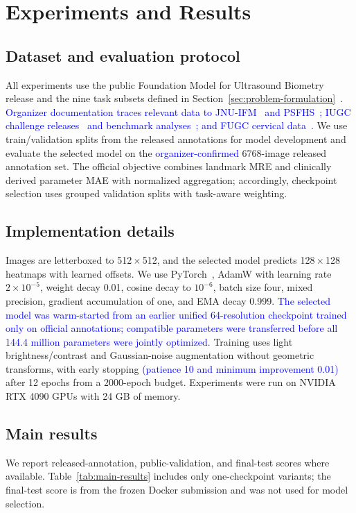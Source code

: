 \documentclass[runningheads]{llncs}
\newcommand{\revisiontext}[1]{\textcolor{blue}{#1}}
\begin{document}
\section{Experiments and Results}
\subsection{Dataset and evaluation protocol}
All experiments use the public Foundation Model for Ultrasound Biometry release and the nine task subsets defined in Section~\ref{sec:problem-formulation}~\cite{fubiometrychallenge}. \revisiontext{Organizer documentation traces relevant data to JNU-IFM~\cite{lu2022jnu} and PSFHS~\cite{chen2024psfhs,bai2025psfhs}; IUGC challenge releases~\cite{bai2024iugc,bai2025iugc} and benchmark analyses~\cite{bai2026iugc,bai2026iugcBeyond}; and FUGC cervical data~\cite{bai2024fugcDataset,bai2026fugc}.} We use train/validation splits from the released annotations for model development and evaluate the selected model on the \revisiontext{organizer-confirmed} 6768-image released annotation set. The official objective combines landmark MRE and clinically derived parameter MAE with normalized aggregation; accordingly, checkpoint selection uses grouped validation splits with task-aware weighting.

\subsection{Implementation details}
Images are letterboxed to 512\,$\times$\,512, and the selected model predicts 128\,$\times$\,128 heatmaps with learned offsets. We use PyTorch~\cite{paszke2019pytorch}, AdamW with learning rate $2\times10^{-5}$, weight decay 0.01, cosine decay to $10^{-6}$, batch size four, mixed precision, gradient accumulation of one, and EMA decay 0.999. \revisiontext{The selected model was warm-started from an earlier unified 64-resolution checkpoint trained only on official annotations; compatible parameters were transferred before all 144.4 million parameters were jointly optimized.} Training uses light brightness/contrast and Gaussian-noise augmentation without geometric transforms, with early stopping \revisiontext{(patience 10 and minimum improvement 0.01)} after 12 epochs from a 2000-epoch budget. Experiments were run on NVIDIA RTX 4090 GPUs with 24 GB of memory.

\subsection{Main results}
We report released-annotation, public-validation, and final-test scores where available. Table~\ref{tab:main-results} includes only one-checkpoint variants; the final-test score is from the frozen Docker submission and was not used for model selection.
\end{document}
